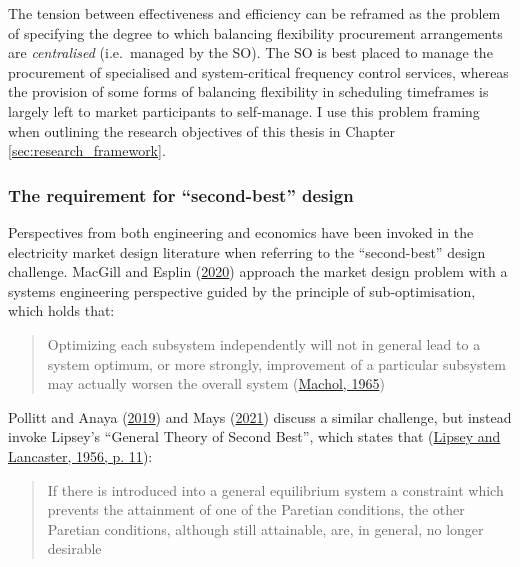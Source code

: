 \documentclass[12pt,a4paper,]{report}
\begin{document}
The tension between effectiveness and efficiency can be reframed as the
problem of specifying the degree to which balancing flexibility
procurement arrangements are \emph{centralised} (i.e.~managed by the
SO). The SO is best placed to manage the procurement of specialised and
system-critical frequency control services, whereas the provision of
some forms of balancing flexibility in scheduling timeframes is largely
left to market participants to self-manage. I use this problem framing
when outlining the research objectives of this thesis in Chapter
\ref{sec:research_framework}.

\hypertarget{sec:lit_review-design-challenges-secondbest}{%
\subsubsection{The requirement for ``second-best''
design}\label{sec:lit_review-design-challenges-secondbest}}

Perspectives from both engineering and economics have been invoked in
the electricity market design literature when referring to the
``second-best'' design challenge. MacGill and Esplin
(\protect\hyperlink{ref-macgillEndtoendElectricityMarket2020}{2020})
approach the market design problem with a systems engineering
perspective guided by the principle of sub-optimisation, which holds
that:

\begin{quote}
Optimizing each subsystem independently will not in general lead to a
system optimum, or more strongly, improvement of a particular subsystem
may actually worsen the overall system
(\protect\hyperlink{ref-machol1965system}{Machol, 1965})
\end{quote}

Pollitt and Anaya
(\protect\hyperlink{ref-pollittCompetitionMarketsAncillary2019}{2019})
and Mays
(\protect\hyperlink{ref-maysMissingIncentivesFlexibility2021}{2021})
discuss a similar challenge, but instead invoke Lipsey's ``General
Theory of Second Best'', which states that
(\protect\hyperlink{ref-lipseyGeneralTheorySecond1956}{Lipsey and
Lancaster, 1956, p. 11}):

\begin{quote}
If there is introduced into a general equilibrium system a constraint
which prevents the attainment of one of the Paretian conditions, the
other Paretian conditions, although still attainable, are, in general,
no longer desirable
\end{quote}
\end{document}
